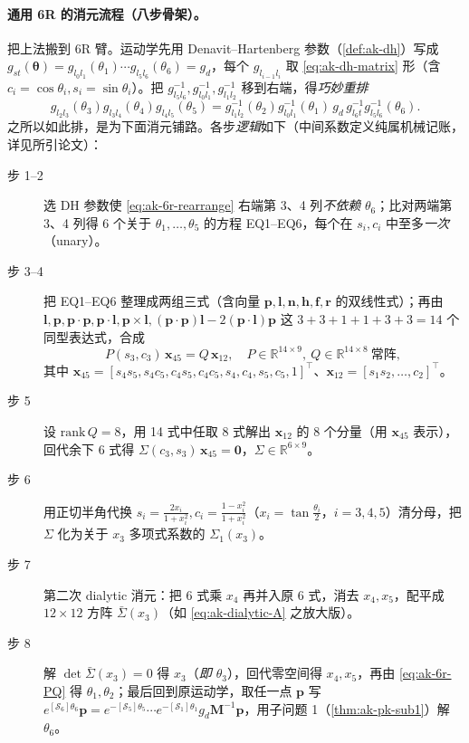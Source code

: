 \paragraph{通用 6R 的消元流程（八步骨架）。}
把上法搬到 6R 臂。运动学先用 Denavit--Hartenberg 参数（\cref{def:ak-dh}）写成 $g_{st}(\boldsymbol{\theta})=g_{l_0l_1}(\theta_1)\cdots g_{l_5l_6}(\theta_6)=g_d$，每个 $g_{l_{i-1}l_i}$ 取 \cref{eq:ak-dh-matrix} 形（含 $c_i=\cos\theta_i,s_i=\sin\theta_i$）。把 $g_{l_5l_6}^{-1},g_{l_0l_1}^{-1},g_{l_1l_2}^{-1}$ 移到右端，得\emph{巧妙重排}\cite{raghavan1993inverse,murray1994mathematical}
\begin{equation}
g_{l_2l_3}(\theta_3)g_{l_3l_4}(\theta_4)g_{l_4l_5}(\theta_5)=g_{l_1l_2}^{-1}(\theta_2)g_{l_0l_1}^{-1}(\theta_1)\,g_d\,g_{l_6t}^{-1}g_{l_5l_6}^{-1}(\theta_6).
\label{eq:ak-6r-rearrange}
\end{equation}
之所以如此排，是为下面消元铺路。各步\emph{逻辑}如下（中间系数定义纯属机械记账，详见所引论文）：
\begin{description}
  \item[步 1--2] 选 DH 参数使 \cref{eq:ak-6r-rearrange} 右端第 3、4 列\emph{不依赖} $\theta_6$；比对两端第 3、4 列得 $6$ 个关于 $\theta_1,\dots,\theta_5$ 的方程 EQ1--EQ6，每个在 $s_i,c_i$ 中至多\emph{一次}（unary）。
  \item[步 3--4] 把 EQ1--EQ6 整理成两组三式（含向量 $\mathbf{p},\mathbf{l},\mathbf{n},\mathbf{h},\mathbf{f},\mathbf{r}$ 的双线性式）；再由 $\mathbf{l},\mathbf{p},\mathbf{p}\!\cdot\!\mathbf{p},\mathbf{p}\!\cdot\!\mathbf{l},\mathbf{p}\!\times\!\mathbf{l},(\mathbf{p}\!\cdot\!\mathbf{p})\mathbf{l}-2(\mathbf{p}\!\cdot\!\mathbf{l})\mathbf{p}$ 这 $3+3+1+1+3+3=14$ 个同型表达式，合成
  \begin{equation}
  P(s_3,c_3)\,\mathbf{x}_{45}=Q\,\mathbf{x}_{12},\quad P\in\mathbb{R}^{14\times9},\ Q\in\mathbb{R}^{14\times8}\ \text{常阵},
  \label{eq:ak-6r-PQ}
  \end{equation}
  其中 $\mathbf{x}_{45}=[s_4s_5,s_4c_5,c_4s_5,c_4c_5,s_4,c_4,s_5,c_5,1]^\top$、$\mathbf{x}_{12}=[s_1s_2,\dots,c_2]^\top$。
  \item[步 5] 设 $\mathrm{rank}\,Q=8$，用 14 式中任取 8 式解出 $\mathbf{x}_{12}$ 的 8 个分量（用 $\mathbf{x}_{45}$ 表示），回代余下 6 式得 $\Sigma(c_3,s_3)\,\mathbf{x}_{45}=\mathbf{0}$，$\Sigma\in\mathbb{R}^{6\times9}$。
  \item[步 6] 用正切半角代换 $s_i=\tfrac{2x_i}{1+x_i^2},c_i=\tfrac{1-x_i^2}{1+x_i^2}$（$x_i=\tan\tfrac{\theta_i}{2}$，$i=3,4,5$）清分母，把 $\Sigma$ 化为关于 $x_3$ 多项式系数的 $\Sigma_1(x_3)$。
  \item[步 7] 第二次 dialytic 消元：把 6 式乘 $x_4$ 再并入原 6 式，消去 $x_4,x_5$，配平成 $12\times12$ 方阵 $\bar{\Sigma}(x_3)$（如 \cref{eq:ak-dialytic-A} 之放大版）。
  \item[步 8] 解 $\det\bar{\Sigma}(x_3)=0$ 得 $x_3$（\emph{即 $\theta_3$}），回代零空间得 $x_4,x_5$，再由 \cref{eq:ak-6r-PQ} 得 $\theta_1,\theta_2$；最后回到原运动学，取任一点 $\mathbf{p}$ 写 $e^{[\mathcal{S}_6]\theta_6}\mathbf{p}=e^{-[\mathcal{S}_5]\theta_5}\cdots e^{-[\mathcal{S}_1]\theta_1}g_d\mathbf{M}^{-1}\mathbf{p}$，用子问题 1（\cref{thm:ak-pk-sub1}）解 $\theta_6$。
\end{description}

